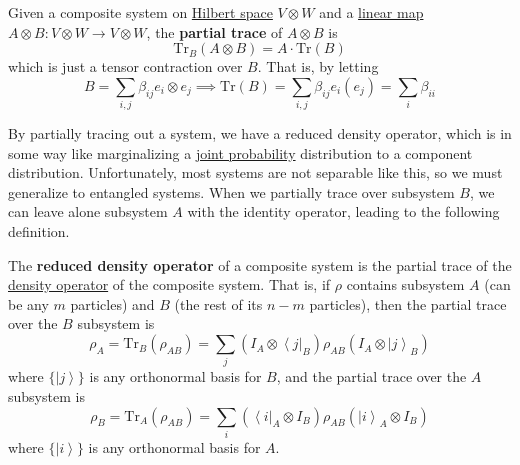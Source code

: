 \documentclass{article}
\newcommand{\ket}[1]{\ensuremath{\left|#1\right\rangle}}
\newcommand{\bra}[1]{\ensuremath{\left\langle#1\right|}}
\newcounter{definition}[section]
\begin{document}
    \begin{definition}
      \label{def:partial-trace-over-separable-systems}
      Given a composite system on \hyperref[fa-def:hilbert-space]{Hilbert space} $V \otimes W$ and a \hyperref[lin-def:linear_map]{linear map} $A \otimes B: V \otimes W \rightarrow V \otimes W$, the \textbf{partial trace} of $A \otimes B$ is 
      \begin{equation}
        \mathrm{Tr}_B (A \otimes B) = A \cdot \mathrm{Tr}(B)
      \end{equation}
      which is just a tensor contraction over $B$. That is, by letting 
      \begin{equation}
        B = \sum_{i, j} \beta_{ij} e_i \otimes e_j \implies \mathrm{Tr}(B) = \sum_{i, j} \beta_{ij} e_i (e_j) = \sum_i \beta_{ii}
      \end{equation}
    \end{definition}

    By partially tracing out a system, we have a reduced density operator, which is in some way like marginalizing a \hyperref[prob-def:joint-probability-law]{joint probability} distribution to a component distribution. Unfortunately, most systems are not separable like this, so we must generalize to entangled systems. When we partially trace over subsystem $B$, we can leave alone subsystem $A$ with the identity operator, leading to the following definition. 

    \begin{definition}
      \label{def:reduced-density-operator}
      The \textbf{reduced density operator} of a composite system is the partial trace of the \hyperref[def:density-operator]{density operator} of the composite system. That is, if $\rho$ contains subsystem $A$ (can be any $m$ particles) and $B$ (the rest of its $n -m$ particles), then the partial trace over the $B$ subsystem is 
      \begin{equation}
        \rho_A = \mathrm{Tr}_{B} (\rho_{AB}) = \sum_j (I_A \otimes \bra{j}_B) \rho_{AB} (I_A \otimes \ket{j}_B)
      \end{equation}
      where $\{\ket{j}\}$ is any orthonormal basis for $B$, and the partial trace over the $A$ subsystem is 
      \begin{equation}
        \rho_B = \mathrm{Tr}_{A} (\rho_{AB}) = \sum_i (\bra{i}_A \otimes I_B) \rho_{AB} (\ket{i}_A \otimes I_B)
      \end{equation}
      where $\{\ket{i}\}$ is any orthonormal basis for $A$.
    \end{definition}
\end{document}
